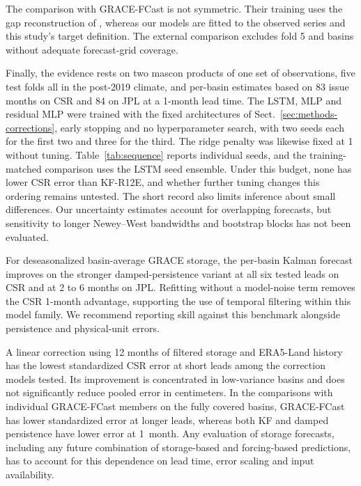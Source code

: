 \documentclass[hess, manuscript]{copernicus}
\begin{document}
The comparison with GRACE-FCast is not symmetric. Their training uses the gap
reconstruction of \citet{yin2023gtws}, whereas our models are fitted to
the observed series and this study's target definition. The external comparison
excludes fold 5 and basins without adequate forecast-grid coverage.

Finally, the evidence rests on two mascon products of one set of
observations, five test folds all in the post-2019 climate, and per-basin
estimates based on 83 issue months on CSR and 84 on JPL at a 1-month
lead time. The LSTM, MLP and
residual MLP were trained with the fixed architectures of
Sect.~\ref{sec:methods-corrections}, early stopping and no hyperparameter
search, with two seeds each for the first two and three for the third.
The ridge penalty was likewise fixed at 1 without tuning.
Table~\ref{tab:sequence} reports individual seeds, and the training-matched
comparison uses the LSTM seed ensemble. Under this budget, none has lower
CSR error than KF-R12E, and whether further tuning changes this ordering
remains untested. The short record also limits inference about small
differences. Our uncertainty estimates account for overlapping forecasts,
but sensitivity to longer Newey--West bandwidths and bootstrap blocks has
not been evaluated.

\conclusions
\label{sec:conclusions}

For deseasonalized basin-average GRACE storage, the per-basin Kalman
forecast improves on the stronger damped-persistence variant at all six
tested leads on CSR and at 2 to 6 months on JPL. Refitting without a
model-noise term removes the CSR 1-month advantage, supporting the
use of temporal filtering within this model family. We recommend reporting
skill against this benchmark alongside persistence and physical-unit errors.

A linear correction using 12 months of filtered storage and
ERA5-Land history has the lowest standardized CSR error at short leads
among the correction models tested. Its improvement is concentrated in
low-variance basins and does not significantly reduce pooled error in
centimeters.
In the comparisons with individual GRACE-FCast members on the fully
covered basins, GRACE-FCast has lower standardized error at longer leads,
whereas both KF and damped persistence have lower error at 1~month. Any evaluation of storage
forecasts, including any future combination of storage-based and
forcing-based predictions, has to account for this dependence on lead
time, error scaling and input availability.
\end{document}
